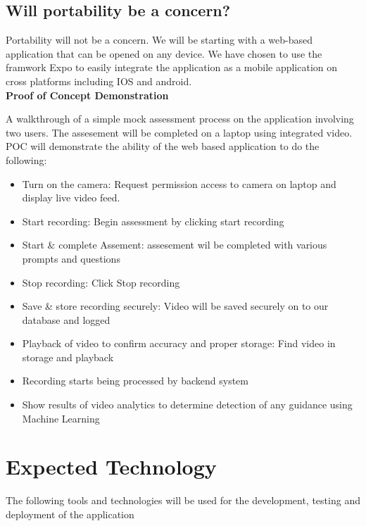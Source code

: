 \documentclass{article}
\begin{document}
\pagebreak

\subsection{Will portability be a concern?}
Portability will not be a concern. We will be starting with a web-based application that can be opened on any device. We have chosen to use the framwork Expo to easily integrate the application as a mobile application on cross platforms including IOS and android.\\


\textbf{Proof of Concept Demonstration}

A walkthrough of a simple mock assessment process on the application involving two users. The assesement will be completed on a laptop using integrated video. POC will demonstrate the ability of the web based application to do the following: \\
\begin{itemize}
  \item Turn on the camera: Request permission access to camera on laptop and display live video feed.
  \item Start recording: Begin assessment by clicking start recording
  \item Start \& complete Assement: assesement wil be completed with various prompts and questions
  \item Stop recording: Click Stop recording
  \item Save \& store recording securely: Video will be saved securely on to our database and logged
  \item Playback of video to confirm accuracy and proper storage: Find video in storage and playback
  \item Recording starts being processed by backend system
  \item Show results of video analytics to determine detection of any guidance using Machine Learning
\end{itemize}

\pagebreak

\section{Expected Technology}

The following tools and technologies will be used for the development, testing and deployment of the application 
\end{document}

